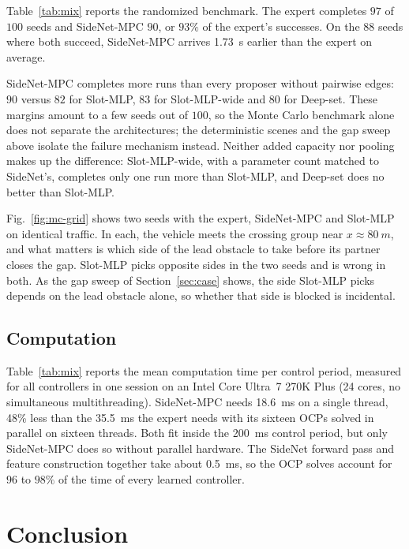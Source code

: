 \documentclass{article}
\theoremstyle{definition}
\begin{document}
Table~\ref{tab:mix} reports the randomized benchmark. The expert
completes $97$ of $100$ seeds and SideNet-MPC $90$, or $93\%$ of the expert's
successes. On the $88$ seeds where both succeed, SideNet-MPC arrives \SI{1.73}{s} earlier than the expert on average.

SideNet-MPC completes more runs than every proposer without pairwise edges:
$90$ versus $82$ for Slot-MLP, $83$ for Slot-MLP-wide and $80$ for Deep-set.
These margins amount to a few seeds out of $100$, so the Monte
Carlo benchmark alone does not separate the architectures; the deterministic scenes and the gap sweep above isolate the failure mechanism instead. Neither added capacity nor pooling makes up the difference: Slot-MLP-wide, with a parameter count matched to SideNet's, completes only one run more than Slot-MLP, and Deep-set does no better than Slot-MLP.

Fig.~\ref{fig:mc-grid} shows two seeds with the expert, SideNet-MPC and
Slot-MLP on identical traffic. In each, the vehicle meets the crossing group
near $x\approx\SI{80}{m}$, and what matters is which side of the lead obstacle to take before its partner closes the gap. Slot-MLP picks opposite sides in
the two seeds and is wrong in both. As the gap sweep of Section~\ref{sec:case} shows, the side Slot-MLP picks depends on the lead obstacle alone, so whether that side is blocked is incidental. 

\subsection{Computation}
\label{sec:comp}

Table~\ref{tab:mix} reports the mean computation time per control period, measured for all controllers in one session on an Intel Core Ultra~7 270K Plus (24 cores, no simultaneous multithreading).
SideNet-MPC needs \SI{18.6}{ms} on a single thread, 48\% less than the \SI{35.5}{ms} the expert needs with its sixteen OCPs solved in parallel on sixteen threads. Both fit inside the \SI{200}{ms} control period, but only SideNet-MPC does so without parallel hardware.
The SideNet forward pass and feature construction together take about \SI{0.5}{ms}, so the OCP solves account for $96$ to $98\%$ of the time of every learned controller.

\section{Conclusion}
\label{sec:conclusion}
\end{document}
